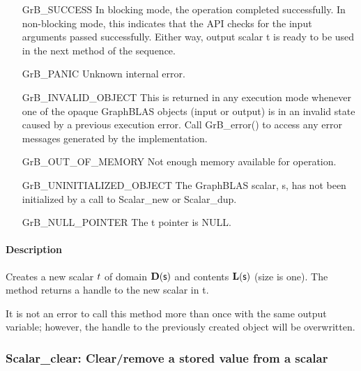 \begin{itemize}[leftmargin=2.1in]
    \item[{\sf GrB\_SUCCESS}]         In blocking mode, the operation completed
    successfully. In non-blocking mode, this indicates that the API checks 
    for the input arguments passed successfully. Either way, output scalar 
    {\sf t} is ready to be used in the next method of the sequence.

    \item[{\sf GrB\_PANIC}]           Unknown internal error.
    
    \item[{\sf GrB\_INVALID\_OBJECT}] This is returned in any execution mode 
    whenever one of the opaque GraphBLAS objects (input or output) is in an invalid 
    state caused by a previous execution error.  Call {\sf GrB\_error()} to access 
    any error messages generated by the implementation.

    \item[{\sf GrB\_OUT\_OF\_MEMORY}] Not enough memory available for operation.
    
    \item[{\sf GrB\_UNINITIALIZED\_OBJECT}]  The GraphBLAS scalar, {\sf s}, has 
    not been initialized by a call to {\sf Scalar\_new} or {\sf Scalar\_dup}.
    
    \item[{\sf GrB\_NULL\_POINTER}]  The {\sf t} pointer is {\sf NULL}.
\end{itemize}

\paragraph{Description}

Creates a new scalar ${t}$ of domain $\mathbf{D}({\sf s})$ and contents 
$\mathbf{L}({\sf s})$ (size is one). The method returns a handle to the new scalar in {\sf t}.

It is not an error to call this method more than once with the same output variable;  
however, the handle to the previously created object will be overwritten. 


\subsubsection{{\sf Scalar\_clear}: Clear/remove a stored value from a scalar}

